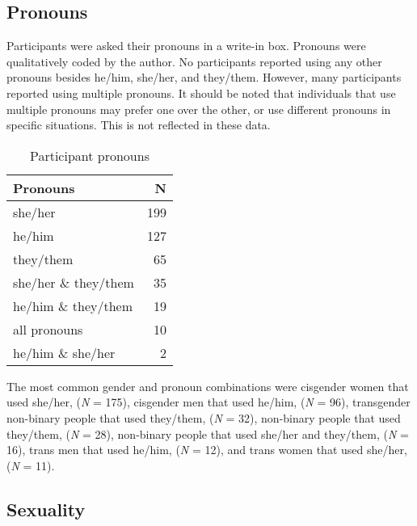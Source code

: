 \documentclass[12pt,twoside]{reedthesis}
\begin{document}
\hypertarget{pronouns}{%
\subsection{Pronouns}\label{pronouns}}

Participants were asked their pronouns in a write-in box. Pronouns were qualitatively coded by the author. No participants reported using any other pronouns besides he/him, she/her, and they/them. However, many participants reported using multiple pronouns. It should be noted that individuals that use multiple pronouns may prefer one over the other, or use different pronouns in specific situations. This is not reflected in these data.
\begin{table}

\caption{\label{tab:cockandballs}Participant pronouns}
\centering
\begin{tabular}[t]{l|r}
\hline
Pronouns & N\\
\hline
she/her & 199\\
\hline
he/him & 127\\
\hline
they/them & 65\\
\hline
she/her \& they/them & 35\\
\hline
he/him \& they/them & 19\\
\hline
all pronouns & 10\\
\hline
he/him \& she/her & 2\\
\hline
\end{tabular}
\end{table}
The most common gender and pronoun combinations were cisgender women that used she/her, (\emph{N} = 175), cisgender men that used he/him, (\emph{N} = 96), transgender non-binary people that used they/them, (\emph{N} = 32), non-binary people that used they/them, (\emph{N} = 28), non-binary people that used she/her and they/them, (\emph{N} = 16), trans men that used he/him, (\emph{N} = 12), and trans women that used she/her, (\emph{N} = 11).

\hypertarget{sexuality}{%
\subsection{Sexuality}\label{sexuality}}
\end{document}
